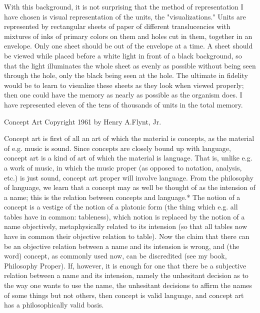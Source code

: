 \documentclass[10pt,twoside]{memoir}
\begin{document}
\begin{enumerate}
{\begin{enumerate}
\begin{sysrules}
\begin{sysrules}
\begin{sysrules}
\begin{sysrules}
{\begin{enumerate}
{{With this background, it is not surprising that the method of 
representation I have chosen is visual representation of the units, the 
"visualizations." Units are represented by rectangular sheets of paper of 
different translucencies with mixtures of inks of primary colors on them and 
holes cut in them, together in an envelope. Only one sheet should be out of 
the envelope at a time. A sheet should be viewed while placed before a white 
light in front of a black background, so that the light illuminates the whole 
sheet as evenly as possible without being seen through the hole, only the 
black being seen at the hole. The ultimate in fidelity would be to learn to 
visualize these sheets as they look when viewed properly; then one could 
have the memory as nearly as possible as the organism does. I have 
represented eleven of the tens of thousands of units in the total memory. 


Concept Art 
Copyright 1961 by Henry A.Flynt, Jr. 


Concept art is first of all an art of which the material is concepts, as the 
material of e.g. music is sound. Since concepts are closely bound up with 
language, concept art is a kind of art of which the material is language. That 
is, unlike e.g. a work of music, in which the music proper (as opposed to 
notation, analysis, etc.) is just sound, concept art proper will involve 
language. From the philosophy of language, we learn that a concept may as 
well be thought of as the intension of a name; this is the relation between 
concepts and language.* The notion of a concept is a vestige of the notion of 
a platonic form (the thing which e.g. all tables have in common: tableness), 
which notion is replaced by the notion of a name objectively, metaphysically 
related to its intension (so that all tables now have in common their 
objective relation to table). Now the claim that there can be an objective 
relation between a name and its intension is wrong, and (the word) concept, 
as commonly used now, can be discredited (see my book, Philosophy 
Proper). If, however, it is enough for one that there be a subjective relation 
between a name and its intension, namely the unhesitant decision as to the 
way one wants to use the name, the unhesitant decisions to affirm the names 
of some things but not others, then concept is valid language, and concept 
art has a philosophically valid basis. 

}}
\end{enumerate}}
\end{sysrules}
\end{sysrules}
\end{sysrules}
\end{sysrules}
\end{enumerate}}
\end{enumerate}
\end{document}
